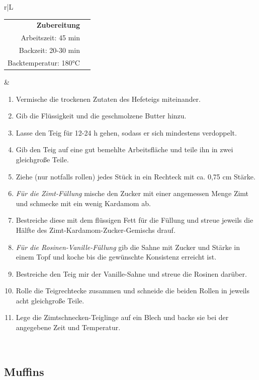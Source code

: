\documentclass[a4paper, 12pt]{scrbook} 								%
\numberwithin{equation}{section} 									%
\begin{document}
		\newpage
		\begin{tabularx}{\textwidth}{r|L}
			\begin{tabular}[t]{rr}
				\textbf{Zubereitung}	\\
				Arbeitszeit: 45 min	\\
				Backzeit: 20-30 min	\\
				Backtemperatur: 180°C \\
			\end{tabular}			&	\begin{enumerate}[]
											\item Vermische die trockenen Zutaten des Hefeteigs miteinander.
											\item Gib die Flüssigkeit und die geschmolzene Butter hinzu.
											\item Lasse den Teig für 12-24 h gehen, sodass er sich mindestens verdoppelt.
											\item Gib den Teig auf eine gut bemehlte Arbeitsfläche und teile ihn in zwei gleichgroße Teile.
											\item Ziehe (nur notfalls rollen) jedes Stück in ein Rechteck mit ca. 0,75 cm Stärke.
											\item \emph{Für die Zimt-Füllung} mische den Zucker mit einer angemessen Menge Zimt und schmecke mit ein wenig Kardamom ab.
											\item Bestreiche diese mit dem flüssigen Fett für die Füllung und streue jeweils die Hälfte des Zimt-Kardamom-Zucker-Gemischs drauf.
											\item \emph{Für die Rosinen-Vanille-Füllung} gib die Sahne mit Zucker und Stärke in einem Topf und koche bis die gewünschte Konsistenz erreicht ist.
											\item Bestreiche den Teig mir der Vanille-Sahne und streue die Rosinen darüber.
											\item Rolle die Teigrechtecke zusammen und schneide die beiden Rollen in jeweils acht gleichgroße Teile.
											\item Lege die Zimtschnecken-Teiglinge auf ein Blech und backe sie bei der angegebene Zeit und Temperatur.
										\end{enumerate}	\\
		\end{tabularx}
		\newpage


		\subsection{Muffins}	\label{muffins}
\end{document}
